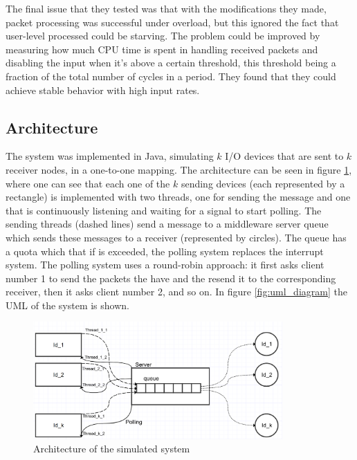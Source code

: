 \documentclass{article}
\begin{document}
The final issue that they tested was that with the modifications they made, packet processing was successful under overload, but this ignored the fact that user-level processed could be starving. The problem could be improved by measuring how much CPU time is spent in handling received packets and disabling the input when it's above a certain threshold, this threshold being a fraction of the total number of cycles in a period. They found that they could achieve stable behavior with high input rates.

\subsection{Architecture}

The system was implemented in Java, simulating $k$ I/O devices that are sent to $k$ receiver nodes, in a one-to-one mapping. The architecture can be seen in figure \ref{fig:arch_diagram}, where one can see that each one of the $k$ sending devices (each represented by a rectangle) is implemented with two threads, one for sending the message and one that is continuously listening and waiting for a signal to start polling. The sending threads (dashed lines) send a message to a middleware server queue which sends these messages to a receiver (represented by circles). The queue has a quota which that if is exceeded, the polling system replaces the interrupt system. The polling system uses a round-robin approach: it first asks client number 1 to send the packets the have and the resend it to the corresponding receiver, then it asks client number 2, and so on. In figure \ref{fig:uml_diagram} the UML of the system is shown.



\begin{figure}[h]
    \centering
    \includegraphics[width=0.85\textwidth]{diagram.png}
    \caption{Architecture of the simulated system}
    \label{fig:arch_diagram}
\end{figure}
\end{document}
